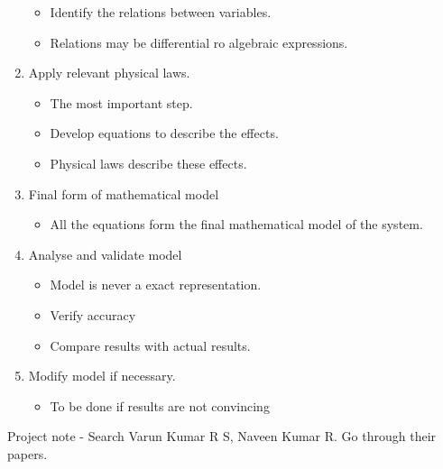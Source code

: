 \documentclass[11pt]{report}
\begin{document}
\begin{enumerate}
\begin{itemize}
\item Identify the relations between variables.

\item Relations may be differential ro algebraic expressions.
\end{itemize}

\item Apply relevant physical laws.

\begin{itemize}
\item The most important step.

\item Develop equations to describe the effects.

\item Physical laws describe these effects.
\end{itemize}

\item Final form of mathematical model

\begin{itemize}
\item All the equations form the final mathematical model of the system.
\end{itemize}

\item Analyse and validate model

\begin{itemize}
\item Model is never a exact representation.

\item Verify accuracy

\item Compare results with actual results.
\end{itemize}

\item Modify model if necessary.

\begin{itemize}
\item To be done if results are not convincing
\end{itemize}
\end{enumerate}

Project note - Search Varun Kumar R S, Naveen Kumar R. Go through their
papers.
\end{document}

